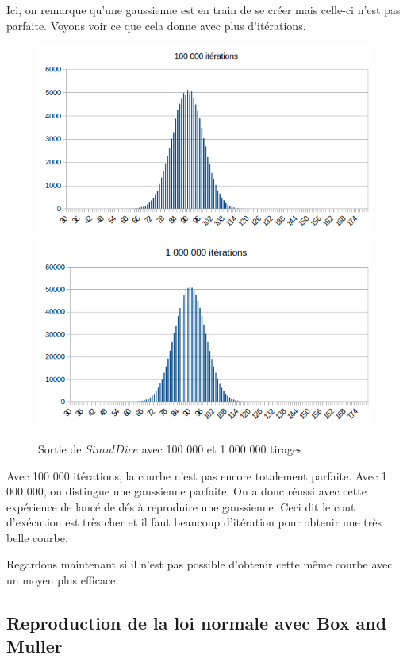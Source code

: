 \documentclass[12pt,french]{article} %
\begin{document}
Ici, on remarque qu'une gaussienne est en train de se créer mais celle-ci n'est pas parfaite. Voyons voir ce que cela donne avec plus d'itérations.

\begin{figure}[H]
	\centering
	\includegraphics[scale=0.35]{exo5-3.png}
	\includegraphics[scale=0.35]{exo5-4.png}
	\caption{Sortie de $SimulDice$ avec 100 000 et 1 000 000 tirages}    
\end{figure}

Avec 100 000 itérations, la courbe n'est pas encore totalement parfaite. Avec 1 000 000, on distingue une gaussienne parfaite. On a donc réussi avec cette expérience de lancé de dés à reproduire une gaussienne. Ceci dit le cout d'exécution est très cher et il faut beaucoup d'itération pour obtenir une très belle courbe. 

Regardons maintenant si il n'est pas possible d'obtenir cette même courbe avec un moyen plus efficace. 

\subsection{Reproduction de la loi normale avec Box and Muller}
\end{document}
